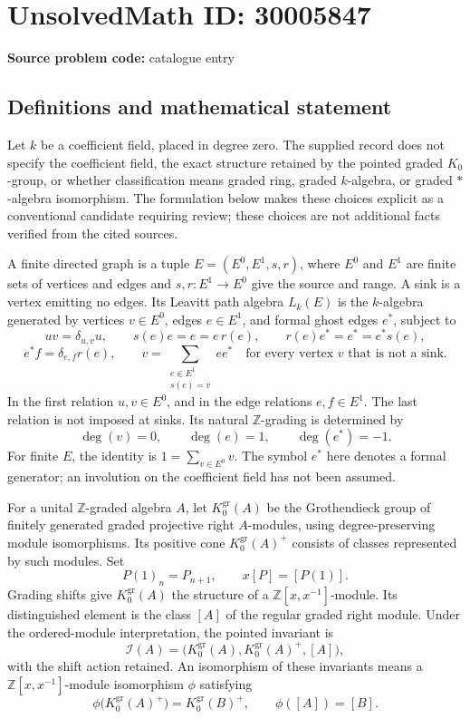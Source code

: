 \documentclass[11pt]{article}
\newcommand{\Z}{\mathbb{Z}}
\begin{document}
\section*{UnsolvedMath ID: 30005847}
\textbf{Source problem code:} catalogue entry
\subsection{Definitions and mathematical statement}
Let \(k\) be a coefficient field, placed in degree zero. The supplied record does not specify the coefficient field, the exact structure retained by the pointed graded \(K_0\)-group, or whether classification means graded ring, graded \(k\)-algebra, or graded \(*\)-algebra isomorphism. The formulation below makes these choices explicit as a conventional candidate requiring review; these choices are not additional facts verified from the cited sources.

A finite directed graph is a tuple \(E=(E^0,E^1,s,r)\), where \(E^0\) and \(E^1\) are finite sets of vertices and edges and \(s,r:E^1\to E^0\) give the source and range. A sink is a vertex emitting no edges. Its Leavitt path algebra \(L_k(E)\) is the \(k\)-algebra generated by vertices \(v\in E^0\), edges \(e\in E^1\), and formal ghost edges \(e^*\), subject to
\[
uv=\delta_{u,v}u,\qquad s(e)e=e=e\,r(e),\qquad r(e)e^*=e^*=e^*s(e),
\]
\[
e^*f=\delta_{e,f}r(e),\qquad
v=\sum_{\substack{e\in E^1\\s(e)=v}}ee^*\quad\text{for every vertex }v\text{ that is not a sink}.
\]
In the first relation \(u,v\in E^0\), and in the edge relations \(e,f\in E^1\). The last relation is not imposed at sinks. Its natural \(\Z\)-grading is determined by
\[
\deg(v)=0,\qquad \deg(e)=1,\qquad \deg(e^*)=-1.
\]
For finite \(E\), the identity is \(1=\sum_{v\in E^0}v\). The symbol \(e^*\) here denotes a formal generator; an involution on the coefficient field has not been assumed.

For a unital \(\Z\)-graded algebra \(A\), let \(K_0^{\mathrm{gr}}(A)\) be the Grothendieck group of finitely generated graded projective right \(A\)-modules, using degree-preserving module isomorphisms. Its positive cone \(K_0^{\mathrm{gr}}(A)^+\) consists of classes represented by such modules. Set
\[
P(1)_n=P_{n+1},\qquad x[P]=[P(1)].
\]
Grading shifts give \(K_0^{\mathrm{gr}}(A)\) the structure of a \(\Z[x,x^{-1}]\)-module. Its distinguished element is the class \([A]\) of the regular graded right module. Under the ordered-module interpretation, the pointed invariant is
\[
\mathcal I(A)=\bigl(K_0^{\mathrm{gr}}(A),K_0^{\mathrm{gr}}(A)^+,[A]\bigr),
\]
with the shift action retained. An isomorphism of these invariants means a \(\Z[x,x^{-1}]\)-module isomorphism \(\phi\) satisfying
\[
\phi\bigl(K_0^{\mathrm{gr}}(A)^+\bigr)=K_0^{\mathrm{gr}}(B)^+,
\qquad \phi([A])=[B].
\]
\end{document}
